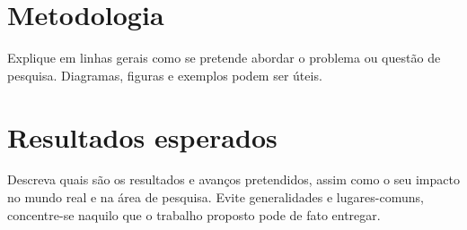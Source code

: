 \documentclass{article}
\begin{document}
\section{Metodologia}

Explique em linhas gerais como se pretende abordar o problema ou questão de pesquisa. Diagramas, figuras e exemplos podem ser úteis.

\section{Resultados esperados}

Descreva quais são os resultados e avanços pretendidos, assim como o seu impacto no mundo real e na área de pesquisa. Evite generalidades e lugares-comuns, concentre-se naquilo que o trabalho proposto pode de fato entregar.



\end{document}
